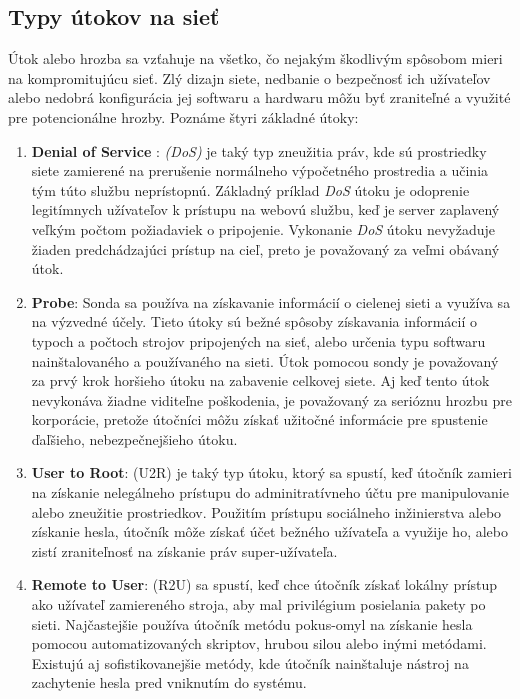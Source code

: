 \subsection{Typy útokov na sieť}
Útok alebo hrozba sa vzťahuje na všetko, čo nejakým škodlivým spôsobom mieri na kompromitujúcu sieť. Zlý dizajn siete, nedbanie o bezpečnosť ich užívateľov alebo nedobrá konfigurácia jej softwaru a hardwaru môžu byť zraniteľné  a využité pre potencionálne hrozby.\cite{kendall}
Poznáme štyri základné útoky:
\begin{enumerate}[label={\arabic*.}]
    \item \textbf{Denial of Service } : \emph{(DoS)} je taký typ zneužitia práv, kde sú prostriedky siete   zamierené na prerušenie normálneho výpočetného prostredia a učinia tým túto službu neprístopnú. Základný príklad \emph{DoS} útoku je odoprenie legitímnych užívateľov k prístupu na webovú službu, keď je server zaplavený veľkým počtom požiadaviek o pripojenie. Vykonanie \emph{DoS} útoku nevyžaduje žiaden predchádzajúci prístup na cieľ, preto je považovaný za veľmi obávaný útok.
    \item \textbf{Probe}: Sonda sa používa na získavanie informácií o cielenej sieti a využíva sa na výzvedné účely. Tieto útoky sú bežné spôsoby získavania informácií o typoch a počtoch strojov pripojených na sieť, alebo určenia typu softwaru nainštalovaného a používaného na sieti. Útok pomocou sondy je považovaný za prvý krok horšieho útoku na zabavenie celkovej siete. Aj keď tento útok nevykonáva žiadne viditeľne poškodenia, je  považovaný za serióznu hrozbu pre korporácie, pretože útočníci môžu získať užitočné informácie pre spustenie ďaľšieho, nebezpečnejšieho útoku.
    \item \textbf{User to Root}: (U2R) je taký typ útoku, ktorý sa spustí, keď útočník zamieri na získanie nelegálneho prístupu do adminitratívneho účtu pre manipulovanie alebo zneužitie prostriedkov. Použitím prístupu sociálneho inžinierstva alebo získanie hesla, útočník môže získať účet bežného užívateľa a využije ho, alebo zistí zraniteľnosť na získanie práv super-užívateľa.
    \item \textbf{Remote to User}: (R2U) sa spustí, keď  chce útočník  získať lokálny prístup ako užívateľ zamiereného stroja, aby mal privilégium posielania pakety po sieti. Najčastejšie používa útočník metódu pokus-omyl na získanie hesla pomocou automatizovaných skriptov, hrubou silou alebo inými metódami. Existujú aj sofistikovanejšie metódy, kde útočník nainštaluje nástroj na zachytenie hesla pred vniknutím do systému.
\end{enumerate} \cite{ahmed}
